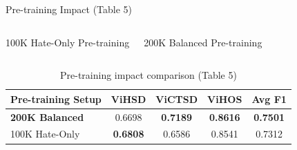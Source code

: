 \documentclass[10pt, aspectratio=169]{beamer}
\begin{document}
\begin{frame}[shrink=12]{Pre-training Impact (Table 5)}
  \begin{columns}[T]
    \begin{block}{100K Hate-Only Pre-training}
      \begin{table}[h]
        \centering
      \end{table}
    \end{block}

    \begin{block}{200K Balanced Pre-training}
      \begin{table}[h]
        \centering
      \end{table}
    \end{block}
  \end{columns}

  \vspace{0.3cm}
  \begin{table}[h]
    \centering
    \begin{tabular}{lcccc}
      \toprule
      \textbf{Pre-training Setup} & \textbf{ViHSD} & \textbf{ViCTSD} & \textbf{ViHOS} & \textbf{Avg F1} \\
      \midrule
      \rowcolor{uitlightblue} \textbf{200K Balanced} & 0.6698 & \textbf{0.7189} & \textbf{0.8616} & \textbf{0.7501} \\
      100K Hate-Only & \textbf{0.6808} & 0.6586 & 0.8541 & 0.7312 \\
      \bottomrule
    \end{tabular}
    \caption{Pre-training impact comparison (Table 5)}
  \end{table}


\end{frame}
\end{document}
